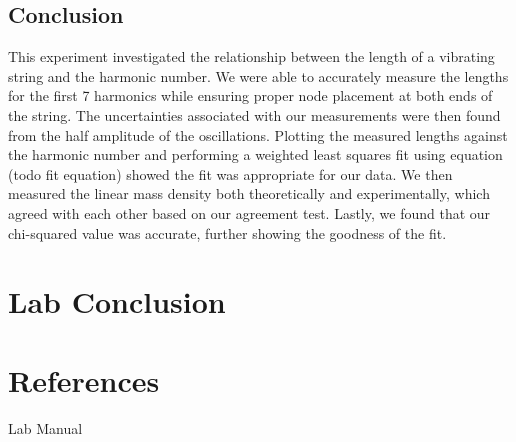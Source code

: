 \documentclass[11pt]{article}
\let\oldsection\section
\renewcommand\section{\clearpage\oldsection}
\begin{document}
    
    \subsection{Conclusion}\label{subsec:part_3_conclusion}
    This experiment investigated the relationship between the length of a vibrating string and the harmonic number. We were able to accurately measure the lengths for the first 7 harmonics while ensuring proper node placement at both ends of the string. The uncertainties associated with our measurements were then found from the half amplitude of the oscillations. Plotting the measured lengths against the harmonic number and performing a weighted least squares fit using equation (todo fit equation) showed the fit was appropriate for our data. We then measured the linear mass density both theoretically and experimentally, which agreed with each other based on our agreement test. Lastly, we found that our chi-squared value was accurate, further showing the goodness of the fit.

    \section{Lab Conclusion}\label{sec:lab_conclusion}
    

    \appendix
    \section{References}\label{sec:references}

    Lab Manual
\end{document}
